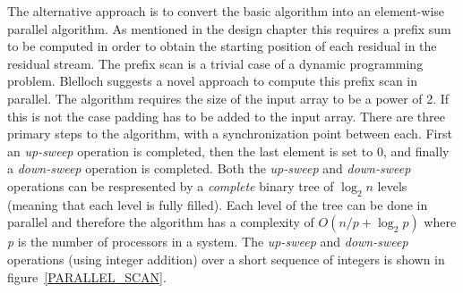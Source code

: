   The alternative approach is to convert the basic algorithm into an element-wise parallel algorithm. As mentioned in the design chapter this requires a prefix sum to be computed 
  in order to obtain the starting position of each residual in the residual stream. The prefix scan is a trivial case of a dynamic programming problem. Blelloch 
  suggests a novel approach \cite{blelloch1990prefix} to compute this prefix scan in parallel. The algorithm requires the size of the input array to be a power of 2. If 
  this is not the case padding has to be added to the input array. There are three primary steps to the algorithm, with a synchronization point between each. First an 
  \textit{up-sweep} operation is completed, then the last element is set to 0, and finally a \textit{down-sweep} operation is completed. Both the \textit{up-sweep} and 
  \textit{down-sweep} operations can be respresented by a \textit{complete} binary tree of $\log_2n$ levels (meaning that each level is fully filled). Each level of the 
  tree can be done in parallel and therefore the algorithm has a complexity of $O(n/p + \log_2{p})$ where \textit{p} is the number of processors in a system. The 
  \textit{up-sweep} and \textit{down-sweep} operations (using integer addition) over a short sequence of integers is shown in figure~\ref{PARALLEL_SCAN}.
